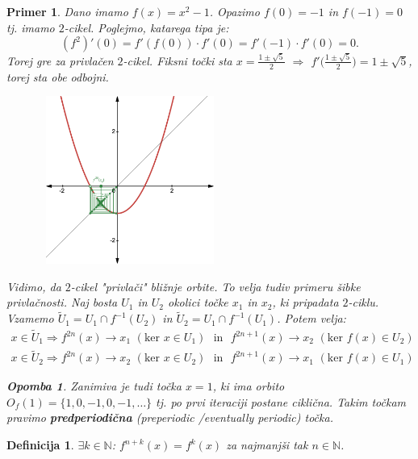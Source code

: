 \documentclass{article}
\newtheorem{definicija}{Definicija}
\newtheorem{opomba}{Opomba}
\newtheorem{primer}{Primer}
\newcommand{\N}{\mathbb{N}}
\begin{document}
\newpage

\begin{primer}
Dano imamo $f(x) = x^2 - 1$. Opazimo $f(0) = -1$ in $f(-1) = 0$ tj. imamo $2$-cikel. Poglejmo, katarega tipa je:
$$
(f^2)'(0) = f'(f(0)) \cdot f'(0) = f'(-1)\cdot f'(0) = 0.
$$
Torej gre za privlačen $2$-cikel. Fiksni točki sta $x = \frac{1 \pm \sqrt{5}}{2}$
$\Longrightarrow$ $f'\Big(\frac{1 \pm \sqrt{5}}{2}\Big) = 1 \pm \sqrt{5}$, torej 
sta obe odbojni.
\begin{figure}[h!]
    \center
        \includegraphics[width=6cm, height=5.5cm]{Grafi/cobweb6.png}
\end{figure}    
\noindent
Vidimo, da $2$-cikel "privlači" bližnje orbite. To velja tudiv primeru 
šibke privlačnosti. Naj bosta $U_1$ in $U_2$ okolici točke $x_1$ in $x_2$,
ki pripadata $2$-ciklu. Vzamemo $\tilde{U}_1 = U_1\cap f^{-1}(U_2)$ in 
$\tilde{U}_2 = U_1\cap f^{-1}(U_1)$. Potem velja:
\begin{align*}
x\in \tilde{U}_1 \Longrightarrow f^{2n}(x) \rightarrow x_1 \,\,(\text{ker } x\in U_1)\,\, \text{ in }\,\, f^{2n+1}(x) \rightarrow x_2 \,\,(\text{ker } f(x)\in U_2)\\
x\in \tilde{U}_2 \Longrightarrow f^{2n}(x) \rightarrow x_2 \,\,(\text{ker } x\in U_2)\,\, \text{ in }\,\, f^{2n+1}(x) \rightarrow x_1 \,\,(\text{ker } f(x)\in U_1)
\end{align*}


\begin{opomba}
Zanimiva je tudi točka $x = 1$, ki ima orbito $O_f(1) = \{1, 0, -1, 0, -1, \dots\}$ 
tj. po prvi iteraciji postane ciklična. Takim točkam pravimo \textbf{predperiodična} 
(preperiodic \slash eventually periodic) točka.
\end{opomba}
\end{primer}

\begin{definicija}
$\exists k\in \N$: $f^{n+k}(x) = f^k(x)$ za  najmanjši tak $n\in \N$.
\end{definicija}
\end{document}
